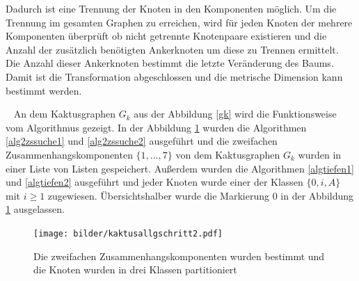 Dadurch ist eine Trennung der Knoten in den Komponenten möglich. Um die Trennung im gesamten Graphen zu erreichen, wird für jeden Knoten der mehrere Komponenten überprüft ob nicht getrennte Knotenpaare existieren und die Anzahl der zusätzlich benötigten Ankerknoten um diese zu Trennen ermittelt. Die Anzahl dieser Ankerknoten bestimmt die letzte Veränderung des Baums. Damit ist die Transformation abgeschlossen und die metrische Dimension kann bestimmt werden.
\begin{bsp}~\newline
An dem Kaktusgraphen $G_k$ aus der Abbildung \ref{gk} wird die Funktionsweise vom Algorithmus gezeigt.
In der Abbildung \ref{kaktus1} wurden die Algorithmen \ref{alg2zssuche1} und \ref{alg2zssuche2} ausgeführt und die zweifachen Zusammenhangskomponenten $\{1, \ldots, 7\}$ von dem Kaktusgraphen $G_k$ wurden in einer Liste von Listen gespeichert. Außerdem wurden die Algorithmen \ref{algtiefen1} und \ref{algtiefen2} ausgeführt und jeder Knoten wurde einer der Klassen $\{0,i,A\}$ mit $i \geq 1$ zugewiesen. Übersichtshalber wurde die Markierung $0$ in der Abbildung \ref{kaktus1} ausgelassen.
 	   	 \begin{figure}[h!]
		\centering
 		 \texttt{[image: bilder/kaktusallgschritt2.pdf]}
   \caption{Die zweifachen Zusammenhangskomponenten wurden bestimmt und die Knoten wurden in drei Klassen partitioniert}
      \label{kaktus1}
  	 \end{figure}
  	 ~\linebreak
  	 

\end{bsp}
